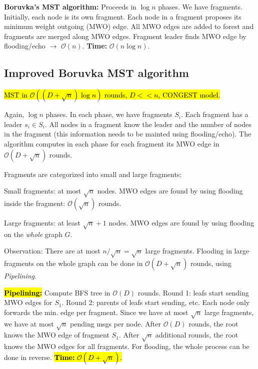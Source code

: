 \documentclass[a4paper, 8pt, landscape]{scrartcl}
\begin{document}
\begin{multicols*}{3}
\textbf{Boruvka's MST algorithm:} Proceeds in $\log n$ phases. We have fragments. Initially, each node is its own fragment. Each node in a fragment proposes its minimum weight outgoing (MWO) edge. All MWO edges are added to forest and fragments are merged along MWO edges. Fragment leader finds MWO edge by flooding/echo $\rightarrow$ $\mathcal{O}(n)$. \textbf{Time:} $\mathcal{O}(n \log n)$.

\subsection{Improved Boruvka MST algorithm}
\hl{MST in $\mathcal{O}((D+\sqrt{n})\log n)$ rounds, $D << n$, CONGEST model.}

Again, $\log n$ phases. In each phase, we have fragments $S_i$. Each fragment has a leader $s_i \in S_i$. All nodes in a fragment know the leader and the number of nodes in the fragment (this information needs to be mainted using flooding/echo). The algorithm computes in each phase for each fragment its MWO edge in $\mathcal{O}(D + \sqrt{n})$ rounds.

Fragments are categorized into small and large fragments:

\vspace*{-2mm}
\begin{compactitem}
\item Small fragments: at most $\sqrt{n}$ nodes. MWO edges are found by using flooding inside the fragment: $\mathcal{O}(\sqrt{n})$ rounds.

\item Large fragments: at least $\sqrt{n}+1$ nodes. MWO edges are found by using flooding on the \textit{whole} graph $G$.
\end{compactitem}
\vspace*{-1mm}

Observation: There are at most $n/\sqrt{n} = \sqrt{n}$ large fragments. Flooding in large fragments on the whole graph can be done in $\mathcal{O}(D + \sqrt{n})$ rounds, using \textit{Pipelining}.

\hl{\textbf{Pipelining:}} Compute BFS tree in $\mathcal{O}(D)$ rounds. Round 1: leafs start sending MWO edges for $S_1$. Round 2: parents of leafs start sending, etc. Each node only forwards the min. edge per fragment. Since we have at most $\sqrt{n}$ large fragments, we have at most $\sqrt{n}$ pending msgs per node. After $\mathcal{O}(D)$ rounds, the root knows the MWO edge of fragment $S_1$. After $\sqrt{n}$ additional rounds, the root knows the MWO edges for all fragments. For flooding, the whole process can be done in reverse. \hl{\textbf{Time:} $\mathcal{O}(D + \sqrt{n})$.}


\end{multicols*}
\end{document}

